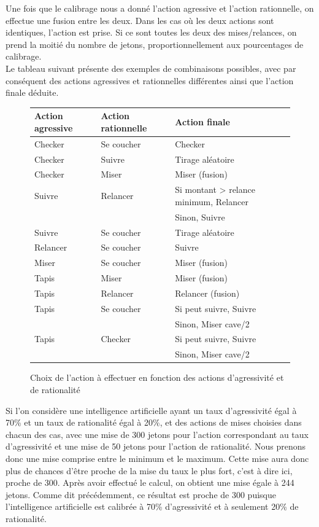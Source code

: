 \documentclass{report}
\begin{document}
Une fois que le calibrage nous a donné l'action agressive et l'action rationnelle, on effectue une fusion entre les deux. Dans les cas où les deux actions sont identiques, l'action est prise. Si ce sont toutes les deux des mises/relances, on prend la moitié du nombre de jetons, proportionnellement aux pourcentages de calibrage.\\

Le tableau suivant présente des exemples de combinaisons possibles, avec par conséquent des actions agressives et rationnelles différentes ainsi que l'action finale déduite.\\


\begin{figure}[H]
\begin{center}
\begin{tabular}{|l|l|l|}
	\hline
	Action agressive		&	Action rationnelle 	&	Action finale\\
	\hline
	Checker		&	Se coucher	&	Checker\\
	\hline
	Checker		&	Suivre		&	Tirage aléatoire\\
	\hline
	Checker		&	Miser		&	Miser (fusion)\\
	\hline
	Suivre		&	Relancer		&	Si montant > relance minimum, Relancer\\
				&				&		Sinon, Suivre\\
	\hline
	Suivre		&	Se coucher	&	Tirage aléatoire\\
	\hline
	Relancer		&	Se coucher	&	Suivre\\
	\hline
	Miser		&	Se coucher	&	Miser (fusion)\\
	\hline
	Tapis		&	Miser		&	Miser (fusion)\\
	\hline
	Tapis		&	Relancer		&	Relancer (fusion)\\
	\hline
	Tapis		&	Se coucher	&	Si peut suivre, Suivre\\
				&				&	Sinon, Miser cave/2\\
	\hline
	Tapis		&	Checker		&	Si peut suivre, Suivre\\
				&				&   Sinon, Miser cave/2\\
	\hline
\end{tabular}
\end{center}
\caption{Choix de l'action à effectuer en fonction des actions d'agressivité et de rationalité}
\end{figure}

Si l'on considère une intelligence artificielle ayant un taux d'agressivité égal à  70\% et un taux de rationalité égal à 20\%, et des actions de mises choisies dans chacun des cas, avec une mise de 300 jetons pour l'action correspondant au taux d'agressivité et une mise de 50 jetons pour l'action de rationalité. Nous prenons donc une mise comprise entre le minimum et le maximum. Cette mise aura donc plus de chances d'être proche de la mise du taux le plus fort, c'est à dire ici, proche de 300. Après avoir effectué le calcul, on obtient une mise égale à 244 jetons. Comme dit précédemment, ce résultat est proche de 300 puisque l'intelligence artificielle est calibrée à 70\% d'agressivité et à seulement 20\% de rationalité.\\
\end{document}
